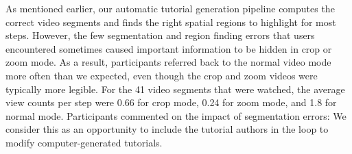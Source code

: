 As mentioned earlier, our automatic tutorial generation pipeline computes the correct video segments and finds the right spatial regions to highlight for most steps. However, the few segmentation and region finding errors that users encountered sometimes caused important information to be hidden in crop or zoom mode. As a result, participants referred back to the normal video mode more often than we expected, even though the crop and zoom videos were typically more legible. For the 41 video segments that were watched, the average view counts per step were 0.66 for crop mode, 0.24 for zoom mode, and 1.8 for normal mode. Participants commented on the impact of segmentation errors:  We consider this as an opportunity to include the tutorial authors in the loop to modify computer-generated tutorials.
